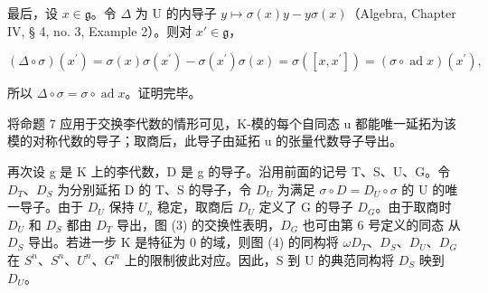 最后，设 \(x \in \mathfrak{g}\)。令 \(\Delta\) 为 U 的内导子 \(y \mapsto \sigma(x)y - y\sigma(x)\)（Algebra, Chapter IV, § 4, no. 3, Example 2）。则对 \(x' \in \mathfrak{g}\)，

\[
(\Delta \circ \sigma) (x ^ {\prime}) = \sigma (x) \sigma (x ^ {\prime}) - \sigma (x ^ {\prime}) \sigma (x) = \sigma ([ x, x ^ {\prime} ]) = (\sigma \circ \operatorname{ad} x) (x ^ {\prime}),
\]

所以 \(\Delta \circ \sigma = \sigma \circ \operatorname{ad} x\)。证明完毕。

将命题 7 应用于交换李代数的情形可见，K-模的每个自同态 u 都能唯一延拓为该模的对称代数的导子；取商后，此导子由延拓 u 的张量代数导子导出。

再次设 g 是 K 上的李代数，D 是 g 的导子。沿用前面的记号 T、S、U、G。令 \(D_{T}\)、\(D_{S}\) 为分别延拓 D 的 T、S 的导子，令 \(D_{U}\) 为满足 \(\sigma \circ D = D_{U} \circ \sigma\) 的 U 的唯一导子。由于 \(D_{U}\) 保持 \(U_{n}\) 稳定，取商后 \(D_{U}\) 定义了 G 的导子 \(D_{G}\)。由于取商时 \(D_{U}\) 和 \(D_{S}\) 都由 \(D_{T}\) 导出，图 (3) 的交换性表明，\(D_{G}\) 也可由第 6 号定义的同态  从 \(D_{S}\) 导出。若进一步 K 是特征为 0 的域，则图 (4) 的同构将 \(\omega\)\(D_{T}\)、\(D_{S}\)、\(D_{U}\)、\(D_{G}\) 在 \(S^{n}\)、\(S^{n}\)、\(U^{n}\)、\(G^{n}\) 上的限制彼此对应。因此，S 到 U 的典范同构将 \(D_{S}\) 映到 \(D_{U}\)。

